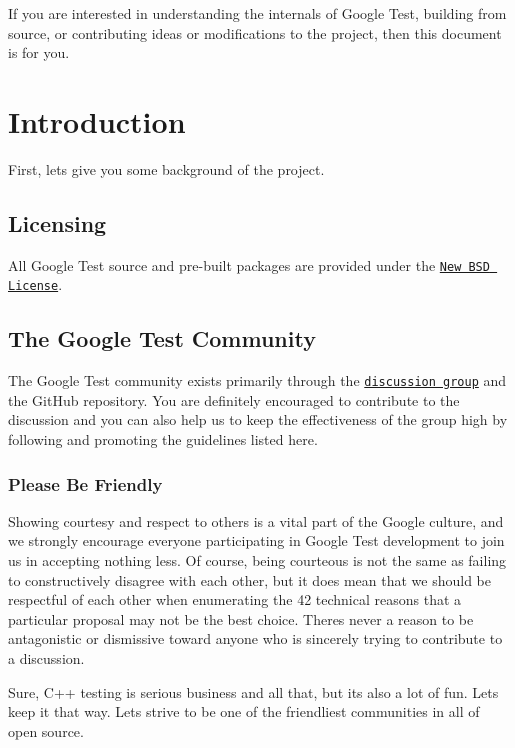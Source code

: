 If you are interested in understanding the internals of Google Test, building from source, or contributing ideas or modifications to the project, then this document is for you.

\section*{Introduction}

First, let\textquotesingle{}s give you some background of the project.

\subsection*{Licensing}

All Google Test source and pre-\/built packages are provided under the \href{http://www.opensource.org/licenses/bsd-license.php}{\tt New B\+SD License}.

\subsection*{The Google Test Community}

The Google Test community exists primarily through the \href{http://groups.google.com/group/googletestframework}{\tt discussion group} and the Git\+Hub repository. You are definitely encouraged to contribute to the discussion and you can also help us to keep the effectiveness of the group high by following and promoting the guidelines listed here.

\subsubsection*{Please Be Friendly}

Showing courtesy and respect to others is a vital part of the Google culture, and we strongly encourage everyone participating in Google Test development to join us in accepting nothing less. Of course, being courteous is not the same as failing to constructively disagree with each other, but it does mean that we should be respectful of each other when enumerating the 42 technical reasons that a particular proposal may not be the best choice. There\textquotesingle{}s never a reason to be antagonistic or dismissive toward anyone who is sincerely trying to contribute to a discussion.

Sure, C++ testing is serious business and all that, but it\textquotesingle{}s also a lot of fun. Let\textquotesingle{}s keep it that way. Let\textquotesingle{}s strive to be one of the friendliest communities in all of open source.

